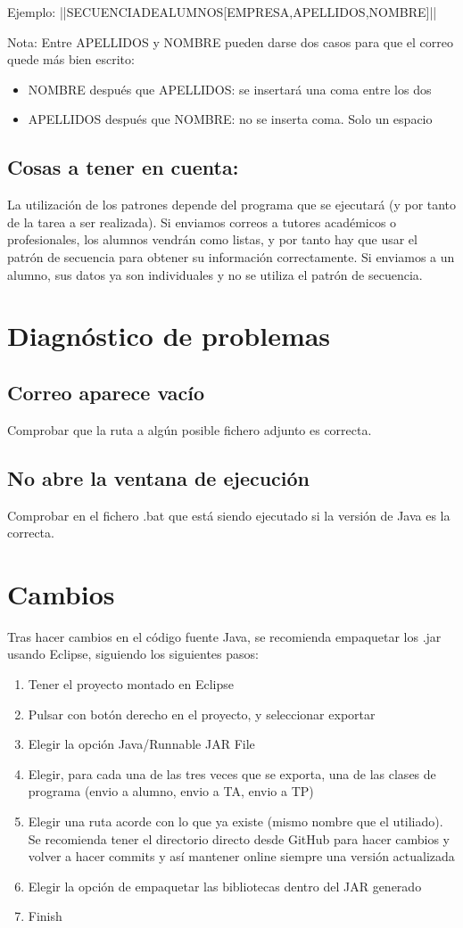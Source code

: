 \documentclass[11pt]{article}
\begin{document}
Ejemplo: ||SECUENCIADEALUMNOS[EMPRESA,APELLIDOS,NOMBRE]||

Nota: Entre APELLIDOS y NOMBRE pueden darse dos casos para que el correo quede más bien escrito:
\begin{itemize}
\item NOMBRE después que APELLIDOS: se insertará una coma entre los dos
\item APELLIDOS después que NOMBRE: no se inserta coma. Solo un espacio
\end{itemize}
\subsection{Cosas a tener en cuenta:}
\label{sec-4-3}
La utilización de los patrones depende del programa que se ejecutará (y por tanto de la tarea a ser realizada). Si enviamos correos a tutores académicos o profesionales, los alumnos vendrán como listas, y por tanto hay que usar el patrón de secuencia para obtener su información correctamente. Si enviamos a un alumno, sus datos ya son individuales y no se utiliza el patrón de secuencia.

\section{Diagnóstico de problemas}
\label{sec-5}
\subsection{Correo aparece vacío}
\label{sec-5-1}
Comprobar que la ruta a algún posible fichero adjunto es correcta.
\subsection{No abre la ventana de ejecución}
\label{sec-5-2}
Comprobar en el fichero .bat que está siendo ejecutado si la versión de Java es la correcta.
\section{Cambios}
\label{sec-6}
Tras hacer cambios en el código fuente Java, se recomienda empaquetar los .jar usando Eclipse, siguiendo los siguientes pasos:
\begin{enumerate}
\item Tener el proyecto montado en Eclipse
\item Pulsar con botón derecho en el proyecto, y seleccionar exportar
\item Elegir la opción Java/Runnable JAR File
\item Elegir, para cada una de las tres veces que se exporta, una de las clases de programa (envio a alumno, envio a TA, envio a TP)
\item Elegir una ruta acorde con lo que ya existe (mismo nombre que el utiliado). Se recomienda tener el directorio directo desde GitHub para hacer cambios y volver a hacer commits y así mantener online siempre una versión actualizada
\item Elegir la opción de empaquetar las bibliotecas dentro del JAR generado
\item Finish
\end{enumerate}
\end{document}
